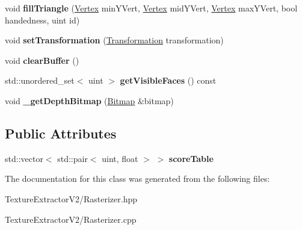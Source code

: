 \begin{DoxyCompactItemize}
\item 
\hypertarget{class_rasterizer_adcecbd138ae8c58d583037467f77ea35}{}void {\bfseries fill\+Triangle} (\hyperlink{struct_vertex}{Vertex} min\+Y\+Vert, \hyperlink{struct_vertex}{Vertex} mid\+Y\+Vert, \hyperlink{struct_vertex}{Vertex} max\+Y\+Vert, bool handedness, uint id)\label{class_rasterizer_adcecbd138ae8c58d583037467f77ea35}

\item 
\hypertarget{class_rasterizer_ad18b358f6db3c9d0304feb402d37689e}{}void {\bfseries set\+Transformation} (\hyperlink{class_transformation}{Transformation} transformation)\label{class_rasterizer_ad18b358f6db3c9d0304feb402d37689e}

\item 
\hypertarget{class_rasterizer_a32023cfe311be2b5118912364a1d2219}{}void {\bfseries clear\+Buffer} ()\label{class_rasterizer_a32023cfe311be2b5118912364a1d2219}

\item 
\hypertarget{class_rasterizer_a53689efa323cb4c5a9df0d4e5b19008f}{}std\+::unordered\+\_\+set$<$ uint $>$ {\bfseries get\+Visible\+Faces} () const \label{class_rasterizer_a53689efa323cb4c5a9df0d4e5b19008f}

\item 
\hypertarget{class_rasterizer_a75040e8d77887db53f23f3fccf9eace7}{}void {\bfseries \+\_\+get\+Depth\+Bitmap} (\hyperlink{class_bitmap}{Bitmap} \&bitmap)\label{class_rasterizer_a75040e8d77887db53f23f3fccf9eace7}

\end{DoxyCompactItemize}
\subsection*{Public Attributes}
\begin{DoxyCompactItemize}
\item 
\hypertarget{class_rasterizer_a8c5ae8edeb03c773a841eef9207bef4d}{}std\+::vector$<$ std\+::pair$<$ uint, float $>$ $>$ {\bfseries score\+Table}\label{class_rasterizer_a8c5ae8edeb03c773a841eef9207bef4d}

\end{DoxyCompactItemize}


The documentation for this class was generated from the following files\+:\begin{DoxyCompactItemize}
\item 
Texture\+Extractor\+V2/Rasterizer.\+hpp\item 
Texture\+Extractor\+V2/Rasterizer.\+cpp\end{DoxyCompactItemize}
